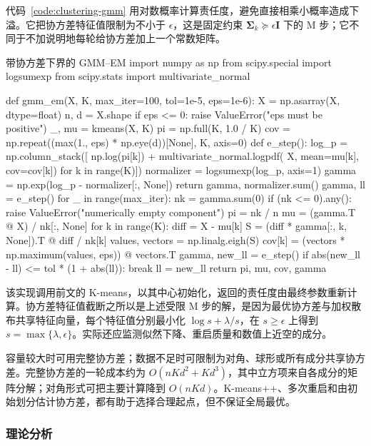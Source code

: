 代码~\ref{code:clustering-gmm} 用对数概率计算责任度，避免直接相乘小概率造成下溢。它把协方差特征值限制为不小于 $\epsilon$，这是固定约束 $\bm{\Sigma}_k\succeq\epsilon\bm{I}$ 下的 M 步；它不同于不加说明地每轮给协方差加上一个常数矩阵。

\begin{codeblock}[language=Python,label={code:clustering-gmm}]{带协方差下界的 GMM--EM}
import numpy as np
from scipy.special import logsumexp
from scipy.stats import multivariate_normal

def gmm_em(X, K, max_iter=100, tol=1e-5, eps=1e-6):
    X = np.asarray(X, dtype=float)
    n, d = X.shape
    if eps <= 0:
        raise ValueError("eps must be positive")
    _, mu = kmeans(X, K)
    pi = np.full(K, 1.0 / K)
    cov = np.repeat((max(1., eps) * np.eye(d))[None], K, axis=0)
    def e_step():
        log_p = np.column_stack([
            np.log(pi[k]) + multivariate_normal.logpdf(
                X, mean=mu[k], cov=cov[k])
            for k in range(K)])
        normalizer = logsumexp(log_p, axis=1)
        gamma = np.exp(log_p - normalizer[:, None])
        return gamma, normalizer.sum()
    gamma, ll = e_step()
    for _ in range(max_iter):
        nk = gamma.sum(0)
        if (nk <= 0).any():
            raise ValueError("numerically empty component")
        pi = nk / n
        mu = (gamma.T @ X) / nk[:, None]
        for k in range(K):
            diff = X - mu[k]
            S = (diff * gamma[:, k, None]).T @ diff / nk[k]
            values, vectors = np.linalg.eigh(S)
            cov[k] = (vectors * np.maximum(values, eps)) @ vectors.T
        gamma, new_ll = e_step()
        if abs(new_ll - ll) <= tol * (1 + abs(ll)):
            break
        ll = new_ll
    return pi, mu, cov, gamma
\end{codeblock}

该实现调用前文的 K-means，以其中心初始化，返回的责任度由最终参数重新计算。协方差特征值截断之所以是上述受限 M 步的解，是因为最优协方差与加权散布共享特征向量，每个特征值分别最小化 $\log s+\lambda/s$，在 $s\geq\epsilon$ 上得到 $s=\max\{\lambda,\epsilon\}$。实际还应监测似然下降、重启质量和数值上近空的成分。

容量较大时可用完整协方差；数据不足时可限制为对角、球形或所有成分共享协方差。完整协方差的一轮成本约为 $O(nKd^2+Kd^3)$，其中立方项来自各成分的矩阵分解；对角形式可把主要计算降到 $O(nKd)$。K-means++、多次重启和由初始划分估计协方差，都有助于选择合理起点，但不保证全局最优。

\subsubsection{理论分析}

